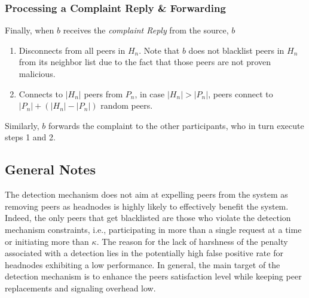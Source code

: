 \subsubsection*{Processing a Complaint Reply \& Forwarding}

Finally, when $b$ receives the \textit{complaint Reply} from the source, $b$ 
\begin{enumerate}
 \item Disconnects from all peers in $H_n$. Note that $b$ does not blacklist peers in $H_n$ from its neighbor list due to the fact that those peers are not proven malicious.
 \item Connects to $|H_n|$ peers from $P_n$, in case $|H_n|>|P_n|$, peers connect to $|P_n|+(|H_n|-|P_n|)$ random peers.
\end{enumerate}
Similarly, $b$ forwards the complaint to the other participants, who in turn execute steps 1 and 2.

\subsection{General Notes}
The detection mechanism does not aim at expelling peers from the system as removing peers as headnodes is highly likely to effectively benefit the system.
Indeed, the only peers that get blacklisted are those who violate the detection mechanism constraints, i.e., participating in more than a single request at a time or initiating more than $\kappa$.
The reason for the lack of harshness of the penalty associated with a detection lies in the potentially high false positive rate for headnodes exhibiting a low performance. 
In general, the main target of the detection mechanism is to enhance the peers satisfaction level while keeping peer replacements and signaling overhead low.







